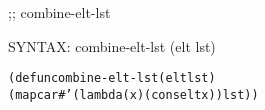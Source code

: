 \begin{aibox}{\function}
;; combine-elt-lst

SYNTAX: combine-elt-lst (elt lst)
\end{aibox}

\begin{aibox}{\examples}

\end{aibox}

\begin{aibox}{\comments}

\end{aibox}
\begin{aibox}{\answers}

\end{aibox}
\begin{aibox}{\othercomments}

\end{aibox}
\begin{aibox}{\pseudocode}

\end{aibox}
\begin{aibox}{\code}

\begin{alltt}
(defun combine-elt-lst (elt lst)
            (mapcar #'(lambda (x) (cons elt x)) lst))

\end{alltt}
\end{aibox}
